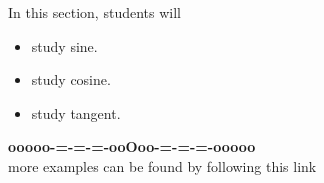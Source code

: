 \documentclass{ximera}
\begin{document}
\begin{sectionOutcomes}
In this section, students will 

\begin{itemize}
\item study sine.
\item study cosine.
\item study tangent.
\end{itemize}
\end{sectionOutcomes}
















\begin{center}
\textbf{\textcolor{green!50!black}{ooooo-=-=-=-ooOoo-=-=-=-ooooo}} \\

more examples can be found by following this link\\ 

\end{center}
\end{document}
